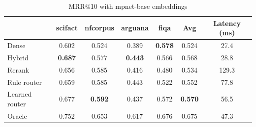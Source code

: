 \begin{table}[t]
\centering
\caption{MRR@10 with mpnet-base embeddings}
\label{tab:mrr_mpnet-base}
\begin{tabular}{lcccccc}
\toprule
 & scifact & nfcorpus & arguana & fiqa & Avg & Latency (ms) \\
\midrule
Dense & 0.602 & 0.524 & 0.389 & \textbf{0.578} & 0.524 & 27.4 \\
Hybrid & \textbf{0.687} & 0.577 & \textbf{0.443} & 0.566 & 0.568 & 28.8 \\
Rerank & 0.656 & 0.585 & 0.416 & 0.480 & 0.534 & 129.3 \\
\midrule
Rule router & 0.659 & 0.585 & 0.443 & 0.522 & 0.552 & 77.8 \\
Learned router & 0.677 & \textbf{0.592} & 0.437 & 0.572 & \textbf{0.570} & 56.5 \\
Oracle & 0.752 & 0.653 & 0.617 & 0.676 & 0.675 & 47.3 \\
\bottomrule
\end{tabular}
\end{table}